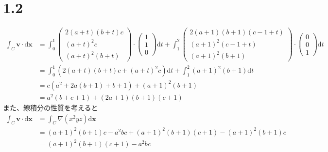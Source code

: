 \documentclass[11pt]{article}
\newcommand{\ds}{\displaystyle}
\begin{document}
	\section*{1.2}
	\begin{align*}
		\ds\int_{C}\mathbf{v}\cdot\mathrm{d}\mathbf{x}
		&=\ds\int_{0}^{1}\left(\begin{array}{ccc}
			2\left(a+t\right)\left(b+t\right)c\\
			\left(a+t\right)^{2}c\\
			\left(a+t\right)^{2}\left(b+t\right)
		\end{array}\right)\cdot\left(\begin{array}{ccc}
		    1\\1\\0
		\end{array}\right)\mathrm{d}t+\ds\int_{1}^{2}\left(\begin{array}{ccc}
		    2\left(a+1\right)\left(b+1\right)\left(c-1+t\right)\\
		    \left(a+1\right)^{2}\left(c-1+t\right)\\
		    \left(a+1\right)^{2}\left(b+1\right)
		\end{array}\right)\cdot\left(\begin{array}{ccc}
		    0\\0\\1
		\end{array}\right)\mathrm{d}t\\
		&=\ds\int_{0}^{1}\left(2\left(a+t\right)\left(b+t\right)c+\left(a+t\right)^{2}c\right)\mathrm{d}t+\ds\int_{1}^{2}\left(a+1\right)^{2}\left(b+1\right)\mathrm{d}t\\
		&=c\left(a^{2}+2a\left(b+1\right)+b+1\right)+\left(a+1\right)^{2}\left(b+1\right)\\
		&=a^{2}\left(b+c+1\right)+\left(2a+1\right)\left(b+1\right)\left(c+1\right)
	\end{align*}
	また、線積分の性質を考えると
	\begin{align*}
		\ds\int_{C}\mathbf{v}\cdot\mathrm{d}\mathbf{x}
		&=\ds\int_{C}\nabla\left(x^{2}yz\right)\mathrm{d}\mathbf{x}\\
		&=\left(a+1\right)^{2}\left(b+1\right)c-a^{2}bc+\left(a+1\right)^{2}\left(b+1\right)\left(c+1\right)-\left(a+1\right)^{2}\left(b+1\right)c\\
		&=\left(a+1\right)^{2}\left(b+1\right)\left(c+1\right)-a^{2}bc
	\end{align*}
	
\end{document}
